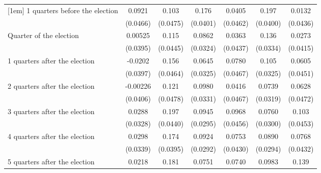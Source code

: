 \begin{table}[htbp]
\begin{tabular}{l*{6}{c}}
[1em]
 1 quarters before the election&      0.0921\sym{*}  &       0.103\sym{*}  &       0.176\sym{***}&      0.0405         &       0.197\sym{***}&      0.0132         \\
                    &    (0.0466)         &    (0.0475)         &    (0.0401)         &    (0.0462)         &    (0.0400)         &    (0.0436)         \\
[1em]
Quarter of the election&     0.00525         &       0.115\sym{**} &      0.0862\sym{**} &      0.0363         &       0.136\sym{***}&      0.0273         \\
                    &    (0.0395)         &    (0.0445)         &    (0.0324)         &    (0.0437)         &    (0.0334)         &    (0.0415)         \\
[1em]
 1 quarters after the election&     -0.0202         &       0.156\sym{***}&      0.0645\sym{*}  &      0.0780         &       0.105\sym{**} &      0.0605         \\
                    &    (0.0397)         &    (0.0464)         &    (0.0325)         &    (0.0467)         &    (0.0325)         &    (0.0451)         \\
[1em]
 2 quarters after the election&    -0.00226         &       0.121\sym{*}  &      0.0980\sym{**} &      0.0416         &      0.0739\sym{*}  &      0.0628         \\
                    &    (0.0406)         &    (0.0478)         &    (0.0331)         &    (0.0467)         &    (0.0319)         &    (0.0472)         \\
[1em]
 3 quarters after the election&      0.0288         &       0.197\sym{***}&      0.0945\sym{**} &      0.0968\sym{*}  &      0.0760\sym{*}  &       0.103\sym{*}  \\
                    &    (0.0328)         &    (0.0440)         &    (0.0295)         &    (0.0456)         &    (0.0300)         &    (0.0453)         \\
[1em]
 4 quarters after the election&      0.0298         &       0.174\sym{***}&      0.0924\sym{**} &      0.0753         &      0.0890\sym{**} &      0.0768         \\
                    &    (0.0339)         &    (0.0395)         &    (0.0292)         &    (0.0430)         &    (0.0294)         &    (0.0432)         \\
[1em]
 5 quarters after the election&      0.0218         &       0.181\sym{***}&      0.0751\sym{*}  &      0.0740         &      0.0983\sym{**} &       0.139\sym{**} \\

\end{tabular}
\end{table}
